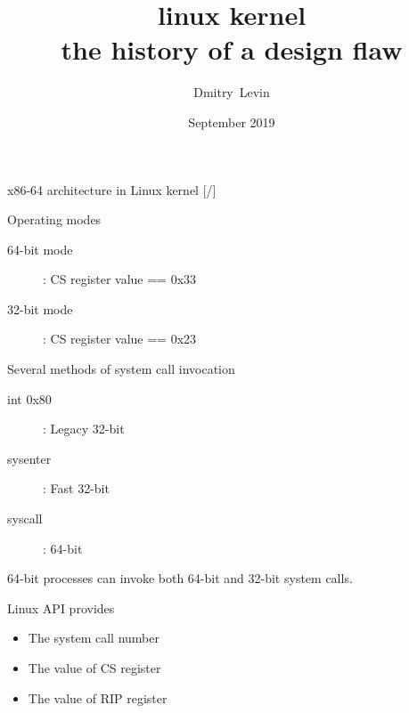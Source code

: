\documentclass[unicode,aspectratio=169]{beamer}
\title{\Huge linux kernel \\ the history of a design flaw}
\author{\Huge Dmitry~Levin}
\date{\Large September 2019}
\begin{document}
\begin{frame}
\titlepage
\end{frame}

\begin{frame}{x86-64 architecture in Linux kernel \hfill [\insertframenumber/\inserttotalframenumber]}
\large
\begin{block}{Operating modes}
\begin{description}
	\item[64-bit mode]: CS register value == 0x33
	\item[32-bit mode]: CS register value == 0x23
\end{description}
\end{block}

\begin{block}{Several methods of system call invocation}
\begin{description}
	\item[int 0x80]: Legacy 32-bit
	\item[sysenter]: Fast 32-bit
	\item[syscall]: 64-bit
\end{description}
\end{block}

64-bit processes can invoke both 64-bit and 32-bit system calls.

\begin{block}{Linux API provides}
\begin{itemize}
	\item The system call number
	\item The value of CS register
	\item The value of RIP register
\end{itemize}
\end{block}
\end{frame}
\end{document}
